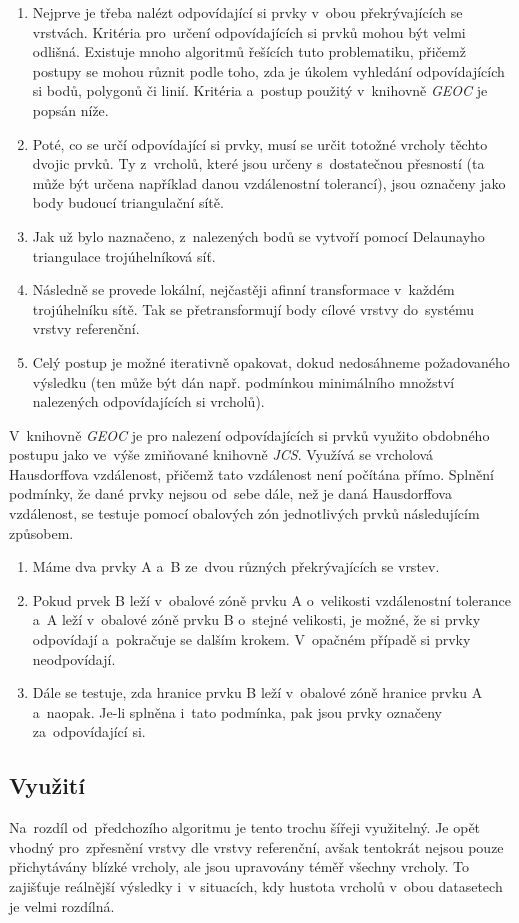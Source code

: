 \begin{enumerate}[leftmargin=*]
 \item Nejprve je třeba nalézt odpovídající si prvky v~obou překrývajících se vrstvách. Kritéria pro~určení odpovídajících si prvků mohou být velmi odlišná. Existuje mnoho
	algoritmů řešících tuto problematiku, přičemž postupy se mohou různit podle toho, zda je úkolem vyhledání odpovídajících si bodů, polygonů či linií. Kritéria a~postup
	použitý v~knihovně \textit{GEOC} je popsán níže.
 \item Poté, co se určí odpovídající si prvky, musí se určit totožné vrcholy těchto dvojic prvků. Ty z~vrcholů, které jsou určeny s~dostatečnou přesností (ta může být určena
	například danou vzdálenostní tolerancí), jsou označeny jako body budoucí triangulační sítě.
 \item Jak už bylo naznačeno, z~nalezených bodů se vytvoří pomocí Delaunayho triangulace trojúhelníková síť.
 \item Následně se provede lokální, nejčastěji afinní transformace v~každém trojúhelníku sítě. Tak se přetransformují body cílové vrstvy do~systému vrstvy referenční.
 \item Celý postup je možné iterativně opakovat, dokud nedosáhneme požadovaného výsledku (ten může být dán např. podmínkou minimálního množství nalezených 
	odpovídajících si vrcholů).
\end{enumerate}

V~knihovně \textit{GEOC} je pro nalezení odpovídajících si prvků využito obdobného postupu jako ve~výše zmiňované knihovně \textit{JCS}. Využívá se vrcholová Hausdorffova 
vzdálenost, přičemž tato vzdálenost není počítána přímo. Splnění podmínky, že dané prvky nejsou od~sebe dále, než je daná Hausdorffova vzdálenost, se testuje pomocí obalových
zón jednotlivých prvků následujícím způsobem.

\begin{enumerate}[leftmargin=*]
 \item Máme dva prvky A a~B ze~dvou různých překrývajících se vrstev.
 \item Pokud prvek B leží v~obalové zóně prvku A o~velikosti vzdálenostní tolerance a~A leží v~obalové zóně prvku B o~stejné velikosti, je možné, že si prvky odpovídají 
	a~pokračuje se dalším krokem. V~opačném případě si prvky neodpovídají.
 \item Dále se testuje, zda hranice prvku B leží v~obalové zóně hranice prvku A a~naopak. Je-li splněna i~tato podmínka, pak jsou prvky označeny za~odpovídající si.
\end{enumerate}


\subsection{Využití}
\label{ca-vyuziti}

Na~rozdíl od~předchozího algoritmu je tento trochu šířeji využitelný. Je opět vhodný pro~zpřesnění vrstvy dle vrstvy referenční, avšak tentokrát nejsou pouze přichytávány
blízké vrcholy, ale jsou upravovány téměř všechny vrcholy. To zajišťuje reálnější výsledky i~v situacích, kdy hustota vrcholů v~obou datasetech je velmi rozdílná.